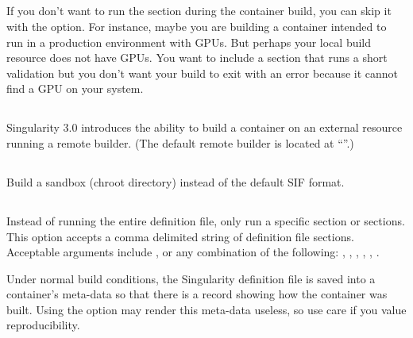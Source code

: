 \documentclass[letterpaper,10pt,english]{sphinxmanual}
\begin{document}
\subsection{}
\label{\detokenize{build_a_container:notest}}
If you don’t want to run the  section during the container build, you can
skip it with the  option. For instance, maybe you are building a
container intended to run in a production environment with GPUs. But
perhaps your local build resource does not have GPUs. You want to
include a  section that runs a short validation but you don’t want your
build to exit with an error because it cannot find a GPU on your system.


\subsection{}
\label{\detokenize{build_a_container:remote}}
Singularity 3.0 introduces the ability to build a container on an external
resource running a remote builder.  (The default remote builder is located at
“”.)


\subsection{}
\label{\detokenize{build_a_container:sandbox}}
Build a sandbox (chroot directory) instead of the default SIF format.


\subsection{}
\label{\detokenize{build_a_container:section}}
Instead of running the entire definition file, only run a specific section or
sections.  This option accepts a comma delimited string of definition file
sections.  Acceptable arguments include ,  or any combination of
the following: , , , , ,
.

Under normal build conditions, the Singularity definition file is saved into
a container’s meta-data so that there is a record showing how the container was
built. Using the  option may render this meta-data useless, so use
care if you value reproducibility.
\end{document}
